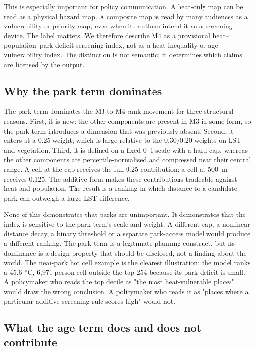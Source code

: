 \documentclass[times,twoside]{_Templates/MultiTargetManuscript}
\begin{document}
This is especially important for policy communication. A heat-only map can be
read as a physical hazard map. A composite map is read by many audiences as a
vulnerability or priority map, even when its authors intend it as a screening
device. The label matters. We therefore describe M4 as a provisional
heat--population--park-deficit screening index, not as a heat inequality or
age-vulnerability index. The distinction is not semantic: it determines which
claims are licensed by the output.

\subsection{Why the park term dominates}

The park term dominates the M3-to-M4 rank movement for three structural reasons.
First, it is new: the other components are present in M3 in some form, so the
park term introduces a dimension that was previously absent. Second, it enters at
a 0.25 weight, which is large relative to the 0.30/0.20 weights on LST and
vegetation. Third, it is defined on a fixed 0--1 scale with a hard cap, whereas
the other components are percentile-normalised and compressed near their central
range. A cell at the cap receives the full 0.25 contribution; a cell at 500~m
receives 0.125. The additive form makes these contributions tradeable against
heat and population. The result is a ranking in which distance to a candidate
park can outweigh a large LST difference.

None of this demonstrates that parks are unimportant. It demonstrates that the
index is sensitive to the park term's scale and weight. A different cap, a
nonlinear distance decay, a binary threshold or a separate park-access model
would produce a different ranking. The park term is a legitimate planning
construct, but its dominance is a design property that should be disclosed, not
a finding about the world. The near-park hot cell example is the clearest
illustration: the model ranks a 45.6~$^\circ$C, 6,971-person cell outside the top
254 because its park deficit is small. A policymaker who reads the top decile as
"the most heat-vulnerable places" would draw the wrong conclusion. A
policymaker who reads it as "places where a particular additive screening rule
scores high" would not.

\subsection{What the age term does and does not contribute}
\end{document}
